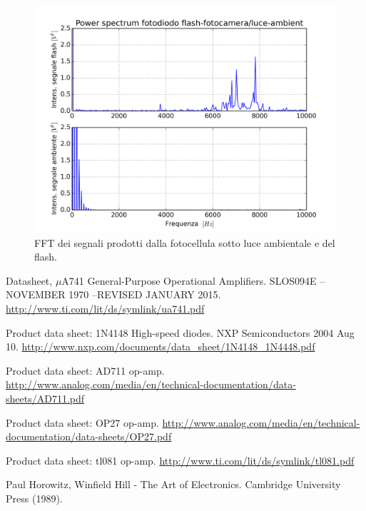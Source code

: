 \documentclass[journal, a4paper]{IEEEtran}
\begin{document}
\begin{figure}
\centering
\includegraphics[width=0.8\linewidth]{./spectral_analysis_flash-senzaflash}
\caption{FFT dei segnali prodotti dalla fotocellula sotto luce ambientale e del flash.}
\label{fig:spectral_analysis_flash-senzaflash}
\end{figure}



\begin{thebibliography}{5}

	Datasheet, $\mu $A741 General-Purpose Operational Amplifiers. SLOS094E – NOVEMBER 1970  –REVISED JANUARY 2015.
	\url{http://www.ti.com/lit/ds/symlink/ua741.pdf}

	Product data sheet: 1N4148 High-speed diodes. NXP Semiconductors 2004 Aug 10.
	\url{http://www.nxp.com/documents/data_sheet/1N4148_1N4448.pdf}

	Product data sheet: AD711 op-amp.
	\url{http://www.analog.com/media/en/technical-documentation/data-sheets/AD711.pdf}
	
	Product data sheet: OP27 op-amp.
	\url{http://www.analog.com/media/en/technical-documentation/data-sheets/OP27.pdf}
	
	Product data sheet: tl081 op-amp.
	\url{http://www.ti.com/lit/ds/symlink/tl081.pdf}

	Paul Horowitz, Winfield Hill - The Art of Electronics. Cambridge University Press (1989).
	
\end{thebibliography}

\end{document}
